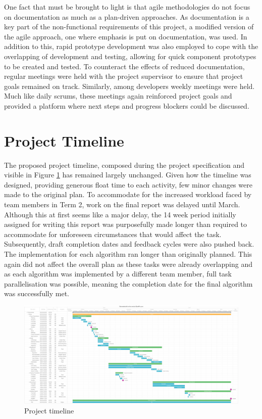 One fact that must be brought to light is that agile methodologies do not focus on documentation as much as a plan-driven approaches. As documentation is a key part of the non-functional requirements of this project, a modified version of the agile approach, one where emphasis is put on documentation, was used. In addition to this, rapid prototype development was also employed to cope with the overlapping of development and testing, allowing for quick component prototypes to be created and tested. To counteract the effects of reduced documentation, regular meetings were held with the project supervisor to ensure that project goals remained on track. Similarly, among developers weekly meetings were held. Much like daily scrums, these meetings again reinforced project goals and provided a platform where next steps and progress blockers could be discussed.

\section{Project Timeline}
The proposed project timeline, composed during the project specification and visible in Figure \ref{fig:timeline} has remained largely unchanged. Given how the timeline was designed, providing generous float time to each activity, few minor changes were made to the original plan. To accommodate for the increased workload faced by team members in Term 2, work on the final report was delayed until March. Although this at first seems like a major delay, the 14 week period initially assigned for writing this report was purposefully made longer than required to accommodate for unforeseen circumstances that would affect the task. Subsequently, draft completion dates and feedback cycles were also pushed back. The implementation for each algorithm ran longer than originally planned. This again did not affect the overall plan as these tasks were already overlapping and as each algorithm was implemented by a different team member, full task parallelisation was possible, meaning the completion date for the final algorithm was successfully met.

\begin{figure}[H]
  \centering
  \includegraphics[width=1.0\textwidth]{Images/ProjectManagement/timeline}
  \caption{Project timeline} 
  \label{fig:timeline} 
\end{figure}

